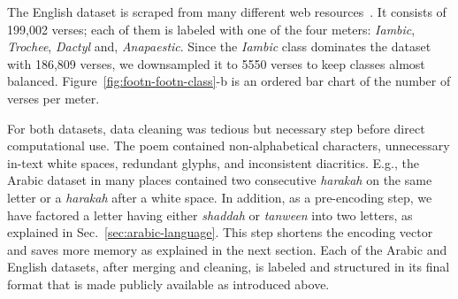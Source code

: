 \documentclass[journal,10pt,twocolumns,letter]{IEEEtran}
\begin{document}
The English dataset is scraped from many different web
resources~\cite{HuberEighteenthCenturyPoetryArchive}. It consists of 199,002 verses; each of them is
labeled with one of the four meters: \textit{Iambic}, \textit{Trochee}, \textit{Dactyl} and,
\textit{Anapaestic}. Since the \textit{Iambic} class dominates the dataset with 186,809 verses, we
downsampled it to 5550 verses to keep classes almost balanced. Figure~\ref{fig:footn-footn-class}-b
is an ordered bar chart of the number of verses per meter.

\bigskip

For both datasets, data cleaning was tedious but necessary step
before direct computational use. The poem contained non-alphabetical characters, unnecessary in-text
white spaces, redundant glyphs, and inconsistent diacritics. E.g., the Arabic dataset in many places
contained two consecutive \textit{harakah} on the same letter or a \textit{harakah} after a white
space. In addition, as a pre-encoding step, we have factored a letter having either \textit{shaddah}
or \textit{tanween} into two letters, as explained in Sec.~\ref{sec:arabic-language}. This step
shortens the encoding vector and saves more memory as explained in the next section. Each of the
Arabic and English datasets, after merging and cleaning, is labeled and structured in its final
format that is made publicly available \citep{Yousef2018PoemComprehensiveDataset} as introduced
above.
\end{document}
